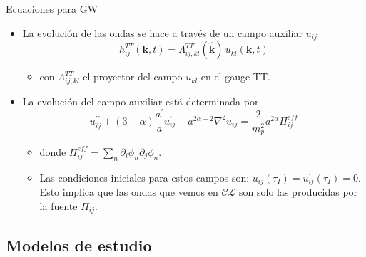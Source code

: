 \documentclass{beamer}
\newcommand{\CosmoLattice}{\ensuremath{\mathcal{C}}\text{osmo}\ensuremath{\mathcal{L}}\text{attice}\xspace}
\begin{document}
            \begin{frame}{Ecuaciones para GW}
                \begin{itemize}
                    \item[\textcolor{brown}{$\bullet$}] La evolución de las ondas se hace a través de un campo auxiliar $u_{ij}$
                        \begin{equation*}
                            h_{ij}^{TT} \left( \textbf{k}, t \right) = \Lambda_{ij,kl}^{TT} \left( \hat{\textbf{k}} \right) \, u_{kl} \left( \textbf{k}, t \right)
                        \end{equation*}
                        \vspace{-0.5cm}
                        \begin{itemize}
                            \item[\textcolor{cyan}{$\Longrightarrow$}] con $\Lambda^{TT}_{ij,kl}$ el proyector del campo $u_{kl}$ en el gauge TT.
                        \end{itemize}
                    \item[\textcolor{brown}{$\bullet$}] La evolución del campo auxiliar está determinada por
                        \begin{equation*}
                            u_{ij}^{\prime \prime} + (3 - \alpha) \frac{a^\prime}{a} u_{ij}^\prime - a^{2\alpha - 2} \nabla^2 u_{ij} = \frac{2}{m_p^2} a^{2 \alpha} \Pi_{ij}^{eff}
                        \end{equation*}
                        \vspace{-0.5cm}
                        \begin{itemize}
                            \item[\textcolor{cyan}{$\Longrightarrow$}] donde $\displaystyle \Pi_{ij}^{eff} = \sum_n \partial_i \phi_n \partial_j \phi_n$.
                            \item[\textcolor{cyan}{$\Longrightarrow$}] Las condiciones iniciales para estos campos son: $u_{ij}(\tau_I) = u_{ij}^\prime(\tau_I) = 0$. Esto implica que las ondas que vemos en \CosmoLattice son solo las producidas por la fuente $\Pi_{ij}$. 
                        \end{itemize}
                \end{itemize}
            \end{frame}

        \subsection{Modelos de estudio}
\end{document}
